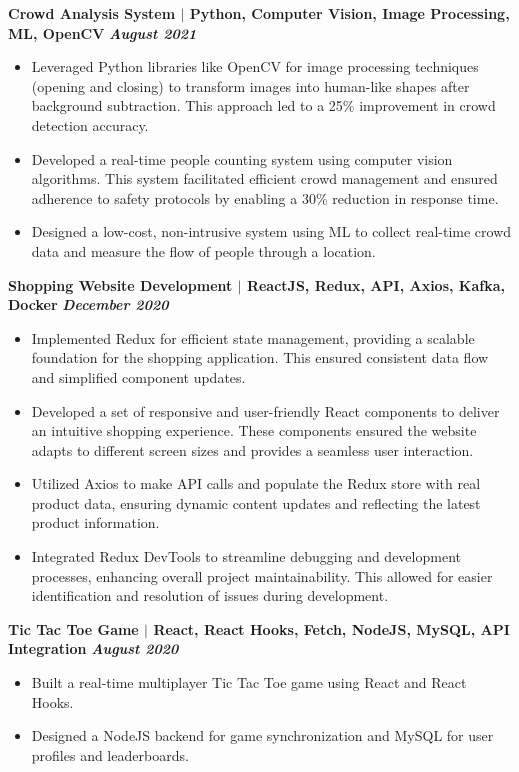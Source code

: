 \documentclass{article}
\begin{document}
\noindent \textbf{Crowd Analysis System $\mid$ Python, Computer Vision, Image Processing, ML, OpenCV} \textit{\hfill \textbf{August 2021}}
\begin{itemize}[noitemsep,nolistsep,leftmargin=*]
  \item {\small Leveraged Python libraries like OpenCV for image processing techniques (opening and closing) to transform images into human-like shapes after background subtraction. This approach led to a 25\% improvement in crowd detection accuracy.}
  \item {\small Developed a real-time people counting system using computer vision algorithms. This system facilitated efficient crowd management and ensured adherence to safety protocols by enabling a 30\% reduction in response time.}
  \item {\small Designed a low-cost, non-intrusive system using ML to collect real-time crowd data and measure the flow of people through a location.}
\end{itemize}
\vspace{1mm} 
\noindent \textbf{Shopping Website Development $\mid$ ReactJS, Redux, API, Axios, Kafka, Docker} \textit{\hfill \textbf{December 2020}} 
\begin{itemize}[noitemsep,nolistsep,leftmargin=*]
  \item {\small Implemented Redux for efficient state management, providing a scalable foundation for the shopping application. This ensured consistent data flow and simplified component updates.}
  \item {\small Developed a set of responsive and user-friendly React components to deliver an intuitive shopping experience. These components ensured the website adapts to different screen sizes and provides a seamless user interaction.}
  \item {\small Utilized Axios to make API calls and populate the Redux store with real product data, ensuring dynamic content updates and reflecting the latest product information.}
  \item {\small Integrated Redux DevTools to streamline debugging and development processes, enhancing overall project maintainability. This allowed for easier identification and resolution of issues during development.}
\end{itemize}
\vspace{1mm} 
\noindent \textbf{Tic Tac Toe Game $\mid$ React, React Hooks, Fetch, NodeJS, MySQL, API Integration} \textit{\hfill \textbf{August 2020}} 
\begin{itemize}[noitemsep,nolistsep,leftmargin=*]
  \item {\small Built a real-time multiplayer Tic Tac Toe game using React and React Hooks.}
  \item {\small Designed a NodeJS backend for game synchronization and MySQL for user profiles and leaderboards.}\\
\end{itemize}


\end{document}
